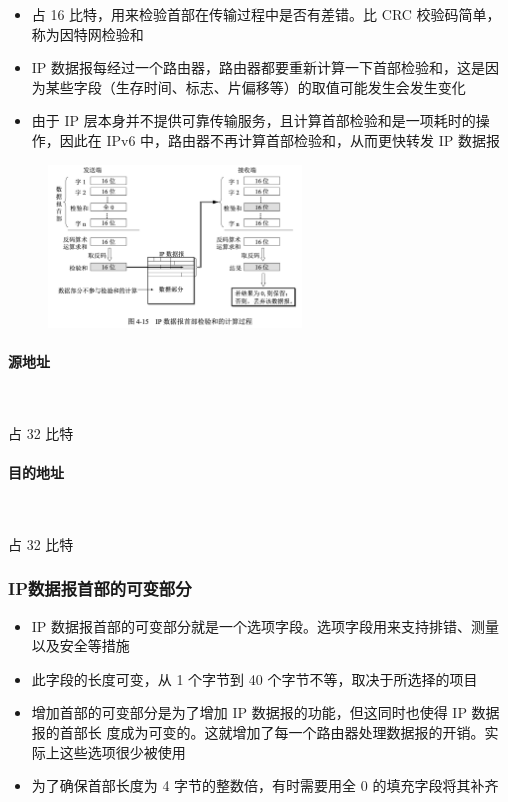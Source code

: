 \documentclass[cs4size,a4paper,10pt]{ctexart}
\begin{document}
	\begin{itemize}
		\item 占 16 比特，用来检验首部在传输过程中是否有差错。比 CRC 校验码简单，称为因特网检验和
		\item IP 数据报每经过一个路由器，路由器都要重新计算一下首部检验和，这是因为某些字段（生存时间、标志、片偏移等）的取值可能发生会发生变化
		\item 由于 IP 层本身并不提供可靠传输服务，且计算首部检验和是一项耗时的操作，因此在 IPv6 中，路由器不再计算首部检验和，从而更快转发 IP 数据报
	\end{itemize}
	\begin{figure}[H]
		\centering
		\includegraphics[width=0.6\textwidth]{img/4.15}
	\end{figure}

	\paragraph{源地址}~{}

	占 32 比特

	\paragraph{目的地址}~{}
	
	占 32 比特

	\subsubsection{IP数据报首部的可变部分}
	\begin{itemize}
		\item IP 数据报首部的可变部分就是一个选项字段。选项字段用来支持排错、测量以及安全等措施
		\item 此字段的长度可变，从 1 个字节到 40 个字节不等，取决于所选择的项目
		\item 增加首部的可变部分是为了增加 IP 数据报的功能，但这同时也使得 IP 数据报的首部长 度成为可变的。这就增加了每一个路由器处理数据报的开销。实际上这些选项很少被使用
		\item 为了确保首部长度为 4 字节的整数倍，有时需要用全 0 的填充字段将其补齐
	\end{itemize}
\end{document}

